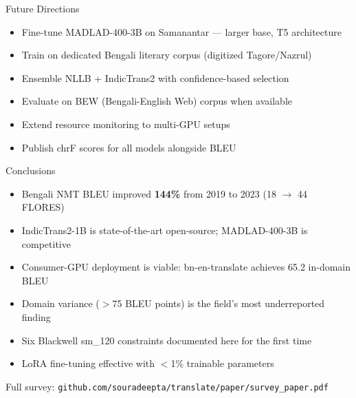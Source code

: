 \documentclass[aspectratio=169,10pt]{beamer}
\begin{document}
\begin{frame}{Future Directions}
  \begin{itemize}
    \item Fine-tune MADLAD-400-3B on Samanantar --- larger base, T5 architecture
    \item Train on dedicated Bengali literary corpus (digitized Tagore/Nazrul)
    \item Ensemble NLLB + IndicTrans2 with confidence-based selection
    \item Evaluate on BEW (Bengali-English Web) corpus when available
    \item Extend resource monitoring to multi-GPU setups
    \item Publish chrF scores for all models alongside BLEU
  \end{itemize}
\end{frame}

\begin{frame}{Conclusions}
  \begin{itemize}
    \item Bengali NMT BLEU improved \textbf{144\%} from 2019 to 2023 (18 $\to$ 44 FLORES)
    \item IndicTrans2-1B is state-of-the-art open-source; MADLAD-400-3B is competitive
    \item Consumer-GPU deployment is viable: bn-en-translate achieves 65.2 in-domain BLEU
    \item Domain variance ($>$75 BLEU points) is the field's most underreported finding
    \item Six Blackwell sm\_120 constraints documented here for the first time
    \item LoRA fine-tuning effective with $<$1\% trainable parameters
  \end{itemize}
  \vspace{0.3cm}
  \begin{center}
    Full survey: \texttt{github.com/souradeepta/translate/paper/survey\_paper.pdf}
  \end{center}
\end{frame}
\end{document}
